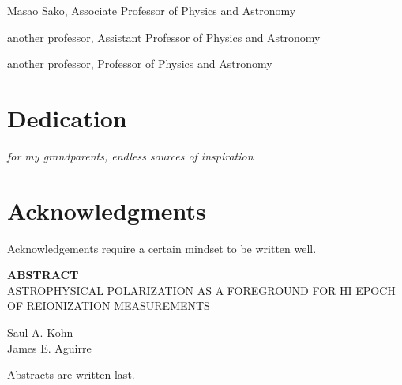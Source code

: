 \documentclass[12pt,twoside,openany]{book}
\makeatletter
\newcommand{\doublespaced}{\renewcommand{\baselinestretch}{2}\normalfont}
\newcommand{\singlespaced}{\renewcommand{\baselinestretch}{1}\normalfont}
\newcommand{\halfspaced}{\renewcommand{\baselinestretch}{1.5}\normalfont}
\newcommand{\unchapter}[1]{%
  \begingroup
  \let\@makechapterhead\@gobble %
  \chapter{#1}
  \endgroup
}
\newcommand{\tita}{ASTROPHYSICAL POLARIZATION AS A FOREGROUND FOR HI EPOCH OF REIONIZATION MEASUREMENTS}
\makeatother
\begin{document}
\noindent Masao Sako, Associate Professor of Physics and Astronomy

\noindent another professor, Assistant Professor of Physics and Astronomy

\noindent another professor, Professor of Physics and Astronomy

\newpage

\pagestyle{plain}
\unchapter{Dedication}
\doublespaced
\vspace*{2in}
\begin{center}
{\large\emph{for my grandparents, endless sources of inspiration}}
\end{center}


\chapter{Acknowledgments}
\halfspaced
Acknowledgements require a certain mindset to be written well.

\newpage
\vspace*{.15 in}
\begin{center}
{\bf ABSTRACT}\\
\tita \\
\parskip=0.2in


Saul A. Kohn\\
James E. Aguirre
\end{center}
\noindent
Abstracts are written last.

\vspace*{\fill}

\newpage

\singlespaced
\tableofcontents

\newpage
{}
{}
\listoftables

\newpage
{}
\listoffigures


\halfspaced
\setlength{\parindent}{0.25in}

\mainmatter
\end{document}

